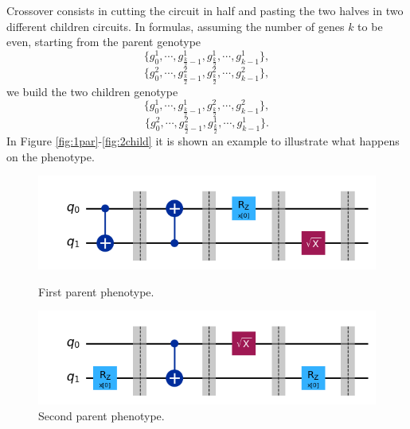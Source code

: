 \documentclass[12pt]{article}
\begin{document}
Crossover consists in cutting the circuit in half and pasting the two halves in two different children circuits. In formulas, assuming the number of genes $k$ to be even, starting from the parent genotype $$\{g^1_0, \cdots , g^1_{\frac{k}{2}-1}, g^1_{\frac{k}{2}}, \cdots, g^1_{k-1}\},$$$$\{g^2_0, \cdots , g^2_{\frac{k}{2}-1}, g^2_{\frac{k}{2}}, \cdots, g^2_{k-1}\},$$ we build the two children genotype $$\{g^1_0, \cdots , g^1_{\frac{k}{2}-1}, g^2_{\frac{k}{2}}, \cdots, g^2_{k-1}\},$$$$\{g^2_0, \cdots , g^2_{\frac{k}{2}-1}, g^1_{\frac{k}{2}}, \cdots, g^1_{k-1}\}.$$
In Figure \ref{fig:1par}-\ref{fig:2child} it is shown an example to illustrate what happens on the phenotype. 
\begin{figure}[h!]
    \centering
    \begin{minipage}{0.7\textwidth}
        \centering
        \includegraphics[width=\linewidth]{images/parent1.png}
        \caption{First parent phenotype.}
        \label{fig:1par}
    \end{minipage}
    \hfill
    \begin{minipage}{0.7\textwidth}
        \centering
        \includegraphics[width=\linewidth]{images/parent2.png}
        \caption{Second parent phenotype.}
        \label{fig:2par}
    \end{minipage}

    \vspace{0.5cm}


\end{figure}
\end{document}
